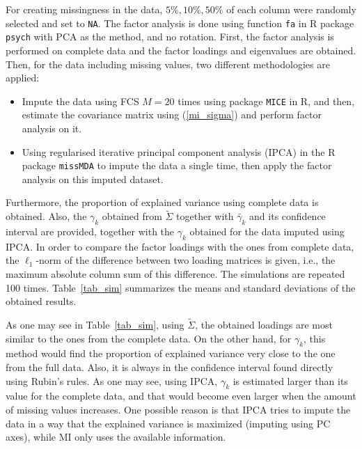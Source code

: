\documentclass[11pt,a5paper,twoside]{book}
\begin{document}
For creating missingness in the data, $5\%,10\%,50\%$ of each column were randomly selected and set to {\tt{NA}}. The factor analysis is done using function {\tt{fa}} in \textsf{R} package {\tt{psych}} with PCA as the method, and no rotation. First, the factor analysis is performed on complete data and the factor loadings and eigenvalues are obtained. Then, for the data including missing values, two different methodologies are applied:
\begin{itemize}
\item Impute the data using FCS \citep{van2007} $M=20$ times using package {\tt{MICE}} in \textsf{R}, and then, estimate the covariance matrix using (\ref{mi_sigma}) and perform factor analysis on it.
\item Using regularised iterative principal component analysis (IPCA) in the \textsf{R} package {\tt{missMDA}} to impute the data a single time, then apply the factor analysis on this imputed dataset.
\end{itemize}

Furthermore, the proportion of explained variance using complete data is obtained. Also, the $\gamma_k$ obtained from $\widetilde{\Sigma}$ together with $\widetilde{\gamma_k}$ and its confidence interval are provided, together with the $\gamma_k$ obtained for the data imputed using IPCA. In order to compare the factor loadings with the ones from complete data, the $\ell_1$-norm of the difference between two loading matrices is given, i.e., the maximum absolute column sum of this difference. The simulations are repeated 100 times. Table~\ref{tab_sim} summarizes the means and standard deviations of the obtained results.

As one may see in Table~\ref{tab_sim}, using $\widetilde{\Sigma}$, the obtained loadings are most similar to the ones from the complete data. On the other hand, for $\gamma_k$, this method would find the proportion of explained variance very close to the one from the full data. Also, it is always in the confidence interval found directly using Rubin's rules. As one may see, using IPCA, $\gamma_k$ is estimated larger than its value for the complete data, and that would become even larger when the amount of missing values increases. One possible reason is that IPCA tries to impute the data in a way that the explained variance is maximized (imputing using PC axes), while MI only uses the available information. 
\end{document}
